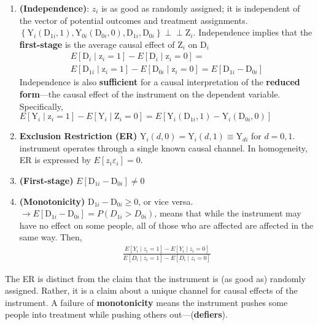 \documentclass[
]{article}
\begin{document}
\begin{enumerate}
\def\labelenumi{\arabic{enumi}.}
\item
  \textbf{(Independence)}: \(z_{i}\) is as good as randomly assigned; it
  is independent of the vector of potential outcomes and treatment
  assignments.
  \(\left\{\mathrm{Y}_{i}\left(\mathrm{D}_{1 i}, 1\right), \mathrm{Y}_{0 i}\left(\mathrm{D}_{0 i}, 0\right), \mathrm{D}_{1 i}, \mathrm{D}_{0 i}\right\} \perp \perp \mathrm{Z}_{i}.\)
  Independence implies that the \textbf{first-stage} is the average
  causal effect of \(\mathrm{Z}_{i}\) on \(\mathrm{D}_{i}\) \[
  \begin{aligned}
  E\left[\mathrm{D}_{i} \mid \mathrm{z}_{i}=1\right]-E\left[\mathrm{D}_{i} \mid \mathrm{z}_{i}=0\right] = \\ E\left[\mathrm{D}_{1 i} \mid \mathrm{z}_{i}=1\right]-E\left[\mathrm{D}_{0 i} \mid \mathrm{z}_{i}=0\right]
  =E\left[\mathrm{D}_{1 i}-\mathrm{D}_{0 i}\right]
  \end{aligned}
  \] Independence is also \textbf{sufficient} for a causal
  interpretation of the \textbf{reduced form}---the causal effect of the
  instrument on the dependent variable. Specifically,
  \(E\left[\mathrm{Y}_{i} \mid \mathrm{z}_{i}=1\right]-E\left[\mathrm{Y}_{i} \mid \mathrm{Z}_{i}=0\right]=E\left[\mathrm{Y}_{i}\left(\mathrm{D}_{1 i}, 1\right)-\mathrm{Y}_{i}\left(\mathrm{D}_{0 i}, 0\right)\right]\)
\item
  \textbf{Exclusion Restriction (ER)}
  \(\mathrm{Y}_{i}(d, 0)=\mathrm{Y}_{i}(d, 1) \equiv \mathrm{Y}_{d i}\)
  for \(d=0,1\). instrument operates through a single known causal
  channel. In homogeneity, ER is expressed by
  \(E[z_i\varepsilon_i] = 0\).
\item
  \textbf{(First-stage)}
  \(E\left[\mathrm{D}_{1 i}-\mathrm{D}_{0 i}\right] \neq 0\)
\item
  \textbf{(Monotonicity)} \(\mathrm{D}_{1 i}-\mathrm{D}_{0 i} \geq 0\),
  or vice versa.
  \(\rightarrow E[\mathrm{D}_{1 i}-\mathrm{D}_{0 i}]=P(D_{1i}>D_{0i})\),
  means that while the instrument may have no effect on some people, all
  of those who are affected are affected in the same way. Then, \[
  \begin{aligned}
  \frac{E\left[Y_{i} \mid z_{i}=1\right]-E\left[Y_{i} \mid z_{i}=0\right]}{E\left[D_{i} \mid z_{i}=1\right]-E\left[D_{i} \mid z_{i}=0\right]}
  \end{aligned}
      \]
\end{enumerate}

The ER is distinct from the claim that the instrument is (as good as)
randomly assigned. Rather, it is a claim about a unique channel for
causal effects of the instrument. A failure of \textbf{monotonicity}
means the instrument pushes some people into treatment while pushing
others out---(\textbf{defiers}).
\end{document}
